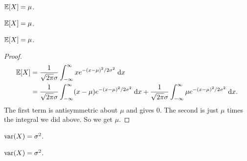 \begin{note}
  \begin{field}
    \begin{prop}
      $\mathbb{E}[X] = \mu$.
    \end{prop}
  \end{field}
  \begin{field}
    \begin{prop}
      $\mathbb{E}[X] = \mu$.
    \end{prop}
  \end{field}
  \xplain{}%
\end{note}

%
\begin{note}
  \begin{field}
    \begin{prop}
      $\mathbb{E}[X] = \mu$.
    \end{prop}
  \end{field}
  \begin{field}
    \begin{proof}
    \begin{align*}
      \mathbb{E}[X] &= \frac{1}{\sqrt{2\pi}\sigma} \int_{-\infty}^\infty x e^{-(x - \mu)^2/2\sigma^2}\;\mathrm{d} x\\
      &= \frac{1}{\sqrt{2\pi} \sigma}\int_{-\infty}^\infty (x - \mu)e^{-(x - \mu)^2/2\sigma^2}\;\mathrm{d} x + \frac{1}{\sqrt{2\pi}\sigma}\int_{-\infty}^\infty \mu e^{-(x - \mu)^2/2\sigma^2}\;\mathrm{d} x.
    \end{align*}
    The first term is antisymmetric about $\mu$ and gives $0$. The second is just $\mu$ times the integral we did above. So we get $\mu$.
    \end{proof}
  \end{field}
  \xplain{}%
\end{note}

\begin{note}
  \begin{field}
    \begin{prop}
      $\operatorname{var}(X) = \sigma^2$.
    \end{prop}
  \end{field}
  \begin{field}
    \begin{prop}
      $\operatorname{var}(X) = \sigma^2$.
    \end{prop}
  \end{field}
  \xplain{}%
\end{note}

